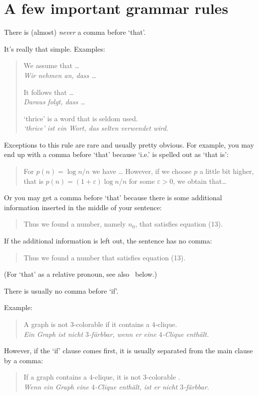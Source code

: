 \section{A few important grammar rules}

\begin{Rule}
  \label{rule:no-comma-before-that}
  There is (almost) \emph{never} a comma before `that'.
\end{Rule}

It's really that simple. Examples:
\begin{quote}
  We assume that \ldots\\
  \emph{Wir nehmen an, dass \ldots}

  It follows that \ldots\\
  \emph{Daraus folgt, dass \ldots}

  `thrice' is a word that is seldom used.\\
  \emph{`thrice' ist ein Wort, das selten verwendet wird.}
\end{quote}
Exceptions to this rule are rare and usually pretty obvious. For
example, you may end up with a comma before `that' because `i.e.' is
spelled out as `that is':
\begin{quote}
  For \(p(n)=\log n/n\) we have \ldots{} However, if we choose \(p\) a
  little bit higher, that is \(p(n)=(1+\varepsilon)\log n/n\) for some
  \(\varepsilon>0\), we obtain that\ldots
\end{quote}
Or you may get a comma before `that' because there is some additional
information inserted in the middle of your sentence:
\begin{quote}
  Thus we found a number, namely \(n_0\), that satisfies equation (13).
\end{quote}
If the additional information is left out, the sentence has no comma:
\begin{quote}
  Thus we found a number that satisfies equation (13).
\end{quote}
(For `that' as a relative pronoun, see also~ below.)

\begin{Rule}
  There is usually no comma before `if'.
\end{Rule}

Example:
\begin{quote}
  A graph is not \(3\)-colorable if it contains a \(4\)-clique.\\
  \emph{Ein Graph ist nicht \(3\)-färbbar, wenn er eine \(4\)-Clique
    enthält.}
\end{quote}
However, if the `if' clause comes first, it is usually separated from
the main clause by a comma:
\begin{quote}
  If a graph contains a \(4\)-clique, it is not \(3\)-colorable .\\
  \emph{Wenn ein Graph eine \(4\)-Clique enthält, ist er nicht
    \(3\)-färbbar.}
\end{quote}

